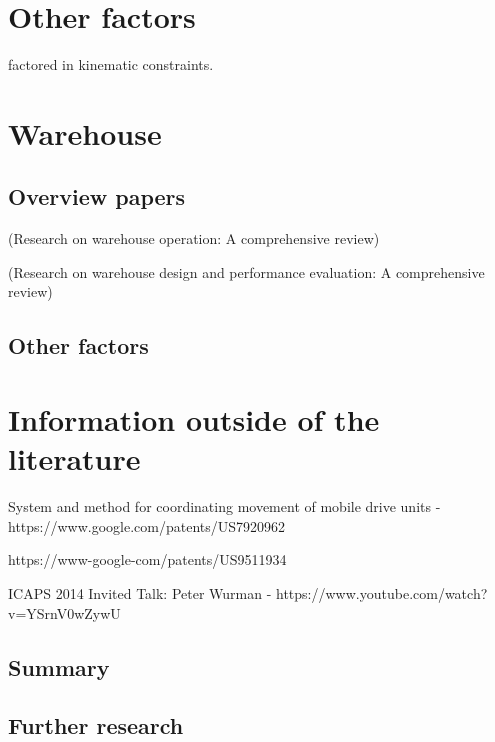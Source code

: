 \documentclass[a4paper,11pt]{article}
\begin{document}
\section{Other factors}
\cite{honig2016multi} factored in kinematic constraints.

\section{Warehouse}

\subsection{Overview papers}
\cite{gu2007research} (Research on warehouse operation: A comprehensive review)

\cite{gu2010research} (Research on warehouse design and performance evaluation: A comprehensive review)

\subsection{Other factors}
\cite{correll2016lessons}


\section{Information outside of the literature}
System and method for coordinating movement of mobile drive units  - https://www.google.com/patents/US7920962

https://www-google-com/patents/US9511934

ICAPS 2014 Invited Talk: Peter Wurman - https://www.youtube.com/watch?v=YSrnV0wZywU

\subsection{Summary}


\subsection{Further research}




\end{document}
